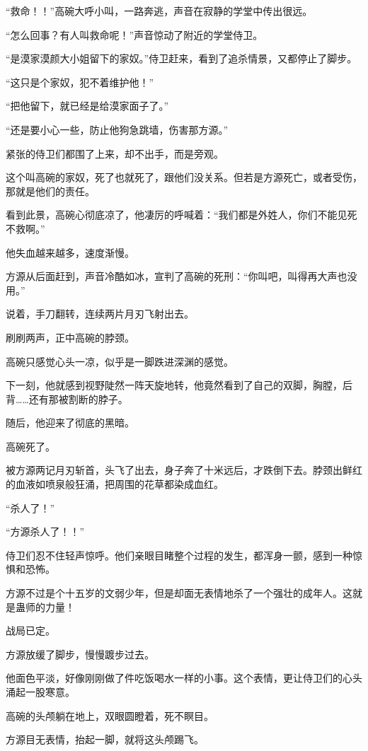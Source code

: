 \begin{this_body}
“救命！！”高碗大呼小叫，一路奔逃，声音在寂静的学堂中传出很远。

“怎么回事？有人叫救命呢！”声音惊动了附近的学堂侍卫。

“是漠家漠颜大小姐留下的家奴。”侍卫赶来，看到了追杀情景，又都停止了脚步。

“这只是个家奴，犯不着维护他！”

“把他留下，就已经是给漠家面子了。”

“还是要小心一些，防止他狗急跳墙，伤害那方源。”

紧张的侍卫们都围了上来，却不出手，而是旁观。

这个叫高碗的家奴，死了也就死了，跟他们没关系。但若是方源死亡，或者受伤，那就是他们的责任。

看到此景，高碗心彻底凉了，他凄厉的呼喊着：“我们都是外姓人，你们不能见死不救啊。”

他失血越来越多，速度渐慢。

方源从后面赶到，声音冷酷如冰，宣判了高碗的死刑：“你叫吧，叫得再大声也没用。”

说着，手刀翻转，连续两片月刃飞射出去。

刷刷两声，正中高碗的脖颈。

高碗只感觉心头一凉，似乎是一脚跌进深渊的感觉。

下一刻，他就感到视野陡然一阵天旋地转，他竟然看到了自己的双脚，胸膛，后背……还有那被割断的脖子。

随后，他迎来了彻底的黑暗。

高碗死了。

被方源两记月刃斩首，头飞了出去，身子奔了十米远后，才跌倒下去。脖颈出鲜红的血液如喷泉般狂涌，把周围的花草都染成血红。

“杀人了！”

“方源杀人了！！”

侍卫们忍不住轻声惊呼。他们亲眼目睹整个过程的发生，都浑身一颤，感到一种惊惧和恐怖。

方源不过是个十五岁的文弱少年，但是却面无表情地杀了一个强壮的成年人。这就是蛊师的力量！

战局已定。

方源放缓了脚步，慢慢踱步过去。

他面色平淡，好像刚刚做了件吃饭喝水一样的小事。这个表情，更让侍卫们的心头涌起一股寒意。

高碗的头颅躺在地上，双眼圆瞪着，死不瞑目。

方源目无表情，抬起一脚，就将这头颅踢飞。


\end{this_body}
